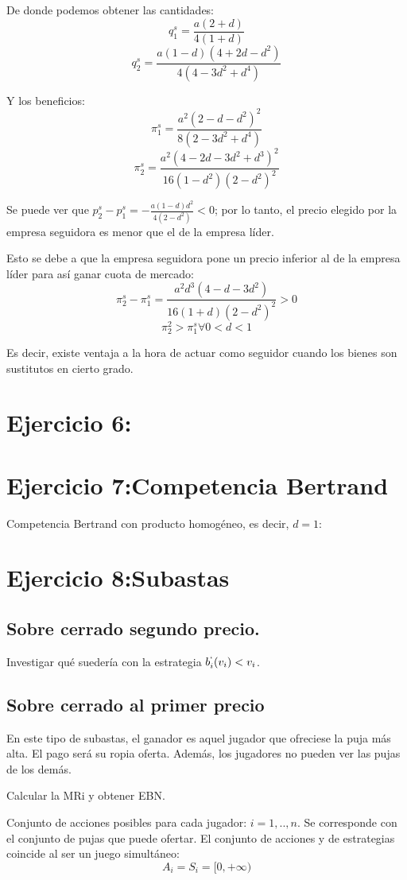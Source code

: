 \documentclass{article}
\theoremstyle{definition}
\theoremstyle{remark}
\begin{document}
De donde podemos obtener las cantidades:
$$q_1^s=\frac{a(2+d)}{4(1+d)}$$
$$q_2^s=\frac{a(1-d)(4+2d-d^2)}{4(4-3d^2+d^4)}$$

Y los beneficios:
$$\pi_1^s=\frac{a^2(2-d-d^2)^2}{8(2-3d^2+d^4)}$$
$$\pi_2^s=\frac{a^2(4-2d-3d^2+d^3)^2}{16(1-d^2)(2-d^2)^2}$$

Se puede ver que $p_2^s-p_1^s=-\frac{a(1-d)d^2}{4(2-d^2)}<0$; por lo tanto, el precio elegido por la empresa seguidora es menor que el de la empresa l\'ider.


Esto se debe a que la empresa seguidora pone un precio inferior al de la empresa l\'ider para as\'i ganar cuota de mercado:
$$\pi_2^s-\pi_1^s=\frac{a^2d^3(4-d-3d^2)}{16(1+d)(2-d^2)^2}>0$$
$$\pi_2^2>\pi_1^s   \forall   0<d<1$$

Es decir, existe ventaja a la hora de actuar como seguidor cuando los bienes son sustitutos en cierto grado.

\section{Ejercicio 6:}
\section{Ejercicio 7:Competencia Bertrand}

Competencia Bertrand con producto homog\'eneo, es decir, $d=1$:
\section{Ejercicio 8:Subastas}
\subsection{Sobre cerrado segundo precio.}
Investigar qu\'e sueder\'ia con la estrategia $b_i^`(v_i)<v_i$.
\subsection{Sobre cerrado al primer precio}

En este tipo de subastas, el ganador es aquel jugador que ofreciese la puja m\'as alta. El pago ser\'a su ropia oferta. Adem\'as, los jugadores no pueden ver las pujas de los dem\'as.

Calcular la MRi y obtener EBN.

Conjunto de acciones posibles para cada jugador: $i=1,..,n$. Se corresponde con el conjunto de pujas que puede ofertar.
El conjunto de acciones y de estrategias coincide al ser un juego simult\'aneo:
$$A_i=S_i=[0,+\infty)$$
\end{document}
